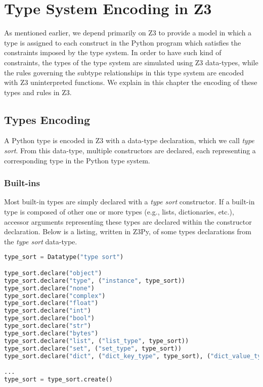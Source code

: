 
\chapter{Type System Encoding in Z3}\label{chapter:ts}
As mentioned earlier, we depend primarily on Z3 to provide a model in which a type is assigned to each construct in the Python program which satisfies the constraints imposed by the type system. In order to have such kind of constraints, the types of the type system are simulated using Z3 data-types, while the rules governing the subtype relationships in this type system are encoded with Z3 uninterpreted functions. We explain in this chapter the encoding of these types and rules in Z3.
\section{Types Encoding}
A Python type is encoded in Z3 with a data-type declaration, which we call \textit{type sort}. From this data-type, multiple constructors are declared, each representing a corresponding type in the Python type system.\\

\subsection{Built-ins}\label{sec:builtin_enc}
Most built-in types are simply declared with a \textit{type sort} constructor. If a built-in type is composed of other one or more types (e.g., lists, dictionaries, etc.), accessor arguments representing these types are declared within the constructor declaration. Below is a listing, written in Z3Py, of some types declarations from the \textit{type sort} data-type.

\begin{lstlisting}[language=python]
type_sort = Datatype("type sort")

type_sort.declare("object")
type_sort.declare("type", ("instance", type_sort))
type_sort.declare("none")
type_sort.declare("complex")
type_sort.declare("float")
type_sort.declare("int")
type_sort.declare("bool")
type_sort.declare("str")
type_sort.declare("bytes")
type_sort.declare("list", ("list_type", type_sort))
type_sort.declare("set", ("set_type", type_sort))
type_sort.declare("dict", ("dict_key_type", type_sort), ("dict_value_type", type_sort))

...
type_sort = type_sort.create()
\end{lstlisting}

